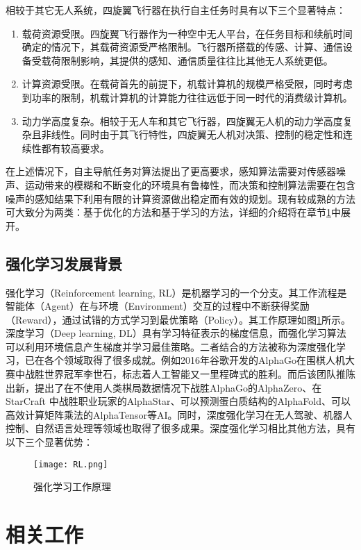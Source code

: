 相较于其它无人系统，四旋翼飞行器在执行自主任务时具有以下三个显著特点：
\begin{enumerate}
  \item 载荷资源受限。四旋翼飞行器作为一种空中无人平台，在任务目标和续航时间确定的情况下，其载荷资源受严格限制。飞行器所搭载的传感、计算、通信设备受载荷限制影响，其提供的感知、通信质量往往比其他无人系统更低。
  \item 计算资源受限。在载荷首先的前提下，机载计算机的规模严格受限，同时考虑到功率的限制，机载计算机的计算能力往往远低于同一时代的消费级计算机。
  \item 动力学高度复杂。相较于无人车和其它飞行器，四旋翼无人机的动力学高度复杂且非线性。同时由于其飞行特性，四旋翼无人机对决策、控制的稳定性和连续性都有较高要求。
\end{enumerate}
在上述情况下，自主导航任务对算法提出了更高要求，感知算法需要对传感器噪声、运动带来的模糊和不断变化的环境具有鲁棒性，而决策和控制算法需要在包含噪声的感知结果下利用有限的计算资源做出稳定而有效的规划。现有较成熟的方法可大致分为两类：基于优化的方法和基于学习的方法，详细的介绍将在章节\ref{ralated_works}中展开。

\subsection{强化学习发展背景}
强化学习（Reinforcement learning, RL）是机器学习的一个分支。其工作流程是智能体（Agent）在与环境（Environment）交互的过程中不断获得奖励（Reward），通过试错的方式学习到最优策略（Policy）。其工作原理如图\ref{fig_RL}所示。深度学习（Deep learning, DL）具有学习特征表示的梯度信息，而强化学习算法可以利用环境信息产生梯度并学习最佳策略。二者结合的方法被称为深度强化学习，已在各个领域取得了很多成就。例如2016年谷歌开发的AlphaGo在围棋人机大赛中战胜世界冠军李世石，标志着人工智能又一里程碑式的胜利。而后该团队推陈出新，提出了在不使用人类棋局数据情况下战胜AlphaGo的AlphaZero、在StarCraft \uppercase\expandafter{}中战胜职业玩家的AlphaStar、可以预测蛋白质结构的AlphaFold、可以高效计算矩阵乘法的AlphaTensor等AI。同时，深度强化学习在无人驾驶、机器人控制、自然语言处理等领域也取得了很多成果。深度强化学习相比其他方法，具有以下三个显著优势：

\begin{figure}
  \centering
  \texttt{[image: RL.png]}
  \caption{强化学习工作原理}
  \label{fig_RL}
\end{figure}

\section{相关工作}
\label{ralated_works}


